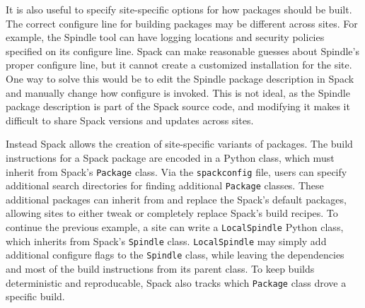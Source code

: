 It is also useful to specify site-specific options for how packages should be built.  The correct configure line for building packages may be different across sites.  For example, the Spindle tool can have logging locations and security policies specified on its configure line.  Spack can make reasonable guesses about Spindle's proper configure line, but it cannot create a customized installation for the site.  One way to solve this would be to edit the Spindle package description in Spack and manually change how configure is invoked.  This is not ideal, as the Spindle package description is part of the Spack source code, and modifying it makes it difficult to share Spack versions and updates across sites.

Instead Spack allows the creation of site-specific variants of packages.  The build instructions for a Spack package are encoded in a Python class, which must inherit from Spack's {\tt Package} class.  Via the {\tt spackconfig} file, users can specify additional search directories for finding additional {\tt Package} classes.  These additional packages can inherit from and replace the Spack's default packages, allowing sites to either tweak or completely replace Spack's build recipes.  To continue the previous example, a site can write a {\tt LocalSpindle} Python class, which inherits from Spack's {\tt Spindle} class.  {\tt LocalSpindle} may simply add additional configure flags to the {\tt Spindle} class, while leaving the dependencies and most of the build instructions from its parent class.  To keep builds deterministic and reproducable, Spack also tracks which {\tt Package} class drove a specific build. 
